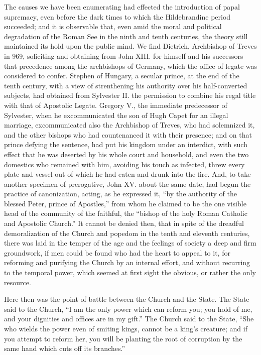 The causes we have been enumerating had effected
the introduction of papal supremacy, even before the dark times
to which the Hildebrandine period succeeded; and it is observable
that, even amid the moral and political degradation of the Roman See
in the ninth and tenth centuries, the theory still maintained its hold
upon the public mind. We find Dietrich, Archbishop of Treves in 969,
soliciting and obtaining from John XIII. for himself and his
successors that precedence among the archbishops of Germany, which the
office of legate was considered to confer. Stephen of Hungary, a
secular prince, at the end of the tenth century, with a view of
strenthening his authority over his half-converted subjects, had
obtained from Sylvester II. the permission to combine his regal title
with that of Apostolic Legate. Gregory V., the immediate predecessor
of Sylvester, when he excommunicated the son of Hugh Capet for an
illegal marriage, excommunicated also the Archbishop of Treves, who
had solemnized it, and the other bishops who had countenanced it with
their presence; and on that prince defying the sentence, had put his
kingdom under an interdict, with such effect that he was deserted by
his whole court and household, and even the two domestics who remained
with him, avoiding his touch as infected, threw every plate and vessel
out of which he had eaten and drunk into the fire. And, to take
another specimen of prerogative, John XV. about the same date, had
begun the practice of canonization, acting, as he expressed it, ``by
the authority of the blessed Peter, prince of Apostles,'' from whom he
claimed to be the one visible head of the community of the faithful,
the ``bishop of the holy Roman Catholic and Apostolic Church.'' It
cannot be denied then, that in spite of the dreadful demoralization of
the Church and popedom in the tenth and eleventh centuries, there was laid in the temper of the age and the feelings of society a
deep and firm groundwork, if men could be found who had the heart to
appeal to it, for reforming and purifying the Church by an internal
effort, and without recurring to the temporal power, which seemed at
first sight the obvious, or rather the only resource.

Here then was the point of battle between the
Church and the State. The State said to the Church, ``I am the only
power which can reform you; you hold of me, and your dignities and
offices are in my gift.'' The Church said to the State, ``She who wields
the power even of smiting kings, cannot be a king's creature; and if
you attempt to reform her, you will be planting the root of corruption
by the same hand which cuts off its branches.''

